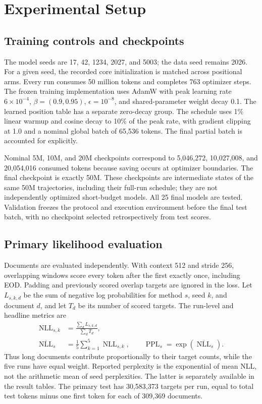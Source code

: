 \documentclass[conference]{IEEEtran}
\newcommand{\nll}{\operatorname{NLL}}
\newcommand{\ppl}{\operatorname{PPL}}
\begin{document}
\section{Experimental Setup}
\subsection{Training controls and checkpoints}
The model seeds are 17, 42, 1234, 2027, and 5003; the data seed remains 2026. For a given seed, the recorded core initialization is matched across positional arms. Every run consumes 50 million tokens and completes 763 optimizer steps. The frozen training implementation uses AdamW with peak learning rate $6\times10^{-4}$, $\beta=(0.9,0.95)$, $\epsilon=10^{-8}$, and shared-parameter weight decay 0.1. The learned position table has a separate zero-decay group. The schedule uses 1\% linear warmup and cosine decay to 10\% of the peak rate, with gradient clipping at 1.0 and a nominal global batch of 65,536 tokens. The final partial batch is accounted for explicitly.

Nominal 5M, 10M, and 20M checkpoints correspond to 5,046,272, 10,027,008, and 20,054,016 consumed tokens because saving occurs at optimizer boundaries. The final checkpoint is exactly 50M. These checkpoints are intermediate states of the same 50M trajectories, including their full-run schedule; they are not independently optimized short-budget models. All 25 final models are tested. Validation freezes the protocol and execution environment before the final test batch, with no checkpoint selected retrospectively from test scores.

\subsection{Primary likelihood evaluation}
Documents are evaluated independently. With context 512 and stride 256, overlapping windows score every token after the first exactly once, including EOD. Padding and previously scored overlap targets are ignored in the loss. Let $L_{s,k,d}$ be the sum of negative log probabilities for method $s$, seed $k$, and document $d$, and let $T_d$ be its number of scored targets. The run-level and headline metrics are
\begin{align}
\nll_{s,k} &= \frac{\sum_d L_{s,k,d}}{\sum_d T_d},\\
\overline{\nll}_s &= \frac{1}{5}\sum_{k=1}^{5}\nll_{s,k},\qquad
\ppl_s=\exp(\overline{\nll}_s).
\end{align}
Thus long documents contribute proportionally to their target counts, while the five runs have equal weight. Reported perplexity is the exponential of mean NLL, not the arithmetic mean of seed perplexities. The latter is separately available in the result tables. The primary test has 30,583,373 targets per run, equal to total test tokens minus one first token for each of 309,369 documents.
\end{document}
